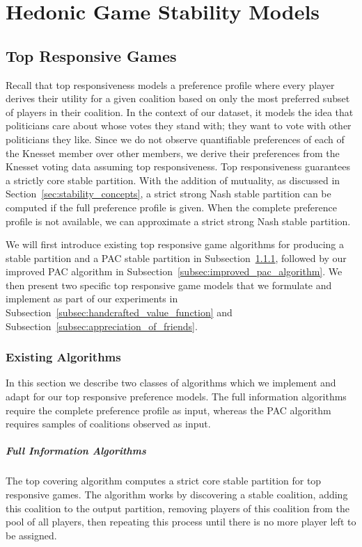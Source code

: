 
\chapter{Hedonic Game Stability Models}
\label{ch:hedonic}

\section{Top Responsive Games}
\label{sec:top_responsive_game}
Recall that top responsiveness models a preference profile where every player
derives their utility for a given coalition based on only the most preferred
subset of players in their coalition.
In the context of our dataset, it models the idea that politicians care about
whose votes they stand with; they want to vote with other politicians they like.
Since we do not observe quantifiable preferences of each of the Knesset member
over other members, we derive their preferences from the Knesset voting data
assuming top responsiveness.
Top responsiveness guarantees a strictly core stable partition.
With the addition of mutuality, as discussed in Section~\ref{sec:stability_concepts},
a strict strong Nash stable partition can be computed if the full preference
profile is given.
When the complete preference profile is not available, we can approximate
a strict strong Nash stable partition.

We will first introduce existing top responsive game algorithms for producing a
stable partition and a PAC stable partition in Subsection~\ref{subsec:algorithms},
followed by our improved PAC algorithm in
Subsection~\ref{subsec:improved_pac_algorithm}.
We then present two specific top responsive game models that we formulate and
implement as part of our experiments in
Subsection~\ref{subsec:handcrafted_value_function} and
Subsection~\ref{subsec:appreciation_of_friends}.

\subsection{Existing Algorithms}
\label{subsec:algorithms}
In this section we describe two classes of algorithms which we implement and adapt
for our top responsive preference models.
The full information algorithms require the complete preference profile as
input, whereas the PAC algorithm requires samples of coalitions observed as input.

\paragraph{Full Information Algorithms}
\label{para:full_pref_algos}
The top covering algorithm\cite{ALCALDE2004869, Dimitrov2006TopRA} computes a
strict core stable partition for top responsive games.
The algorithm works by discovering a stable coalition, adding this coalition
to the output partition, removing players of this coalition from the pool
of all players, then repeating this process until there is no more player left
to be assigned.


